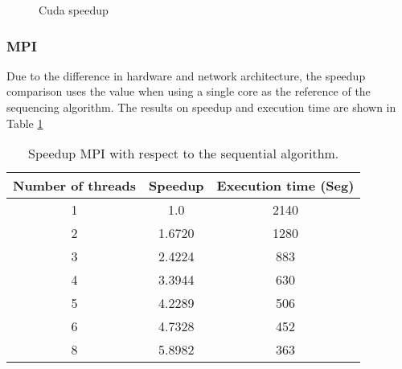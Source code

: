 \documentclass{IEEEtran}
\begin{document}

\begin{figure}[ht]
  \centering
  
  \caption{Cuda speedup}
  \label{fig:cuda speed}
\end{figure}

\subsubsection{MPI}

Due to the difference in hardware and network architecture, the speedup comparison uses the value when using a single core as the reference of the sequencing algorithm. The results on speedup and execution time are shown in Table \ref{tab:mpi}


\begin{table}[h]
  \centering
  \begin{tabular}{|c|c|c|}
    \hline
    \textbf{Number of threads} & \textbf{Speedup} & \textbf{Execution time (Seg)} \\ \hline
    1                          & 1.0              & 2140                          \\
    2                          & 1.6720           & 1280                          \\
    3                          & 2.4224           & 883                           \\
    4                          & 3.3944           & 630                           \\
    5                          & 4.2289           & 506                           \\
    6                          & 4.7328           & 452                           \\
    8                          & 5.8982           & 363                           \\ \hline
  \end{tabular}
  \caption{Speedup MPI with respect to the sequential algorithm.}
  \label{tab:mpi}
\end{table}
\end{document}
